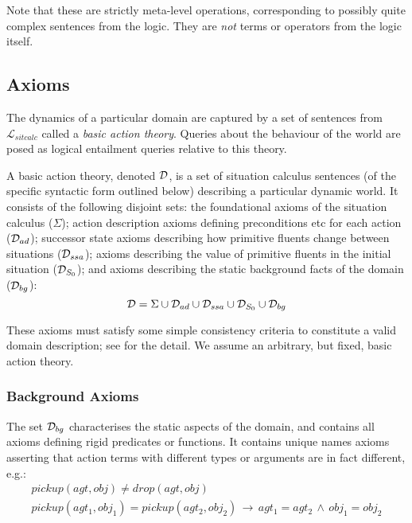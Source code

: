 Note that these are strictly meta-level operations, corresponding
to possibly quite complex sentences from the logic. They are \emph{not}
terms or operators from the logic itself.


\subsection{Axioms\label{sec:Background:SC:Axioms}}

The dynamics of a particular domain are captured by a set of sentences
from $\mathcal{L}_{sitcalc}$ called a \emph{basic action theory}.
Queries about the behaviour of the world are posed as logical entailment
queries relative to this theory.

\begin{defnL}
 A basic action theory, denoted
$\mathcal{D}$, is a set of situation calculus sentences (of the specific
syntactic form outlined below) describing a particular dynamic world.
It consists of the following disjoint sets: the foundational axioms
of the situation calculus ($\Sigma$); action description axioms defining
preconditions etc for each action ($\mathcal{D}_{ad}$); successor state axioms
describing how primitive fluents change between situations ($\mathcal{D}_{ssa}$);
axioms describing the value of primitive fluents in the initial situation
($\mathcal{D}_{S_{0}}$); and axioms describing the static background facts
of the domain ($\mathcal{D}_{bg}$):\[
\mathcal{D}=\Sigma\cup\mathcal{D}_{ad}\cup\mathcal{D}_{ssa}\cup\mathcal{D}_{S_{0}}\cup\mathcal{D}_{bg}\]

\end{defnL}
These axioms must satisfy some simple consistency criteria to constitute
a valid domain description; see \citep{pirri99contributions_sitcalc}
for the detail. We assume an arbitrary, but fixed, basic action theory.


\subsubsection{Background Axioms}

The set $\mathcal{D}_{bg}$ characterises the static aspects of the domain,
and contains all axioms defining rigid predicates or functions. It
contains unique names axioms asserting that action terms with different
types or arguments are in fact different, e.g.:\begin{gather*}
pickup(agt,obj)\neq drop(agt,obj)\\
pickup(agt_{1},obj_{1})=pickup(agt_{2},obj_{2})\,\rightarrow\, agt_{1}=agt_{2}\,\wedge\, obj_{1}=obj_{2}\end{gather*}


